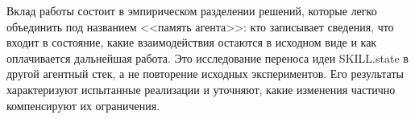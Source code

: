 Вклад работы состоит в эмпирическом разделении решений, которые легко объединить под названием <<память агента>>: кто записывает сведения, что входит в состояние, какие взаимодействия остаются в исходном виде и как оплачивается дальнейшая работа. Это исследование переноса идеи SKILL.state в другой агентный стек, а не повторение исходных экспериментов. Его результаты характеризуют испытанные реализации и уточняют, какие изменения частично компенсируют их ограничения.
